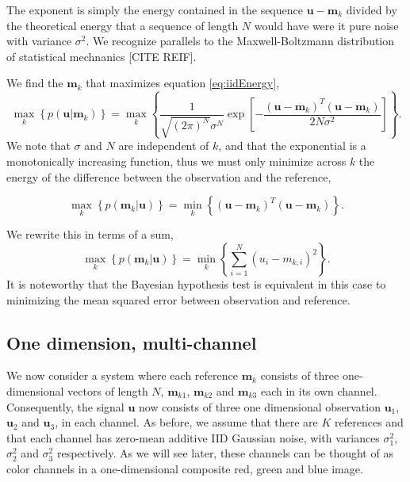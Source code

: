 The exponent is simply the energy contained in the sequence $\mathbf{u}-\mathbf{m}_k$ divided by the
theoretical energy that a sequence of length $N$ would have were it pure noise with variance $\sigma^2$. We recognize parallels to the Maxwell-Boltzmann distribution of statistical
mechnanics [CITE REIF].  

We find the $\mathbf{m}_k$ that maximizes equation \ref{eq:iidEnergy},
\begin{equation}
\max_k   \left\{ p(\mathbf{u}|\mathbf{m}_k) \right\} =  \max_k  \left\{ \frac{1}{  \sqrt{ (2\pi)^N} \sigma^N  } \exp\left[ -\frac{(\mathbf{u}-\mathbf{m}_k)^T(\mathbf{u}-\mathbf{m}_k)} {2 N \sigma^2 } \right] \right\}. 
\end{equation}
We note that $\sigma$ and $N$ are independent of $k$, and that the exponential is a monotonically increasing function, thus we must only minimize across $k$ the energy of the difference between the observation and the reference,

\begin{equation}
\max_k   \left\{ p(\mathbf{m}_k|\mathbf{u}) \right\} =  \min_k  \left\{ (\mathbf{u}-\mathbf{m}_k)^T(\mathbf{u}-\mathbf{m}_k) \right\}. 
\end{equation}

We rewrite this in terms of a sum,
\begin{equation}
\max_k   \left\{ p(\mathbf{m}_k|\mathbf{u}) \right\} =  \min_k  \left\{ \sum_{i=1}^N  (u_i-m_{k,i})^2   \right\}. 
\end{equation}
It is noteworthy that the Bayesian hypothesis test is equivalent in this case to minimizing the mean squared error between observation and reference.


\subsection{One dimension, multi-channel}\label{sec:simpleModel}
We now consider a system where each reference $\mathbf{m}_k$ consists of three one-dimensional vectors of length $N$, $\mathbf{m}_{k1}$, $\mathbf{m}_{k2}$ and $\mathbf{m}_{k3}$ each in its own channel. Consequently, the signal $\mathbf{u}$ now consists of three one dimensional observation $\mathbf{u}_1$, $\mathbf{u}_2$ and $\mathbf{u}_3$, in each channel. As before, we assume that there are $K$ references and that each channel has zero-mean additive IID Gaussian noise, with variances $\sigma_1^2$, $\sigma_2^2$ and $\sigma_3^2$ respectively. As we will see later, these channels can be thought of as color channels in a one-dimensional composite red, green and blue image. 


